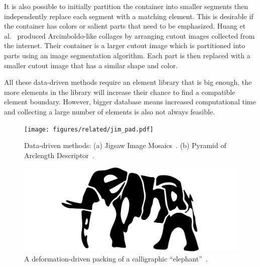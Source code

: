 \newtext
{
It is also possible to initially partition the container into smaller segments
then independently replace each segment with a matching element.
This is desirable if the container has colors or salient parts that need to be emphasized.
Huang et al.~\cite{Huang2011} produced Arcimboldo-like collages
by arranging cutout images collected from the internet.
Their container is a larger cutout image which is partitioned into parts
using an image segmentation algorithm.
Each part is then replaced with a smaller cutout image that has a similar shape and color.
}

\newtext
{
All these data-driven methods require an element library that is big enough,
the more elements in the library will increase their chance to find a compatible element boundary.
However, bigger database means increased computational time and
collecting a large number of elements is also not always feasible.
}

\begin{figure}
\centering
\texttt{[image: figures/related/jim\_pad.pdf]} 
\caption[Packings generated by JIM and PAD]
{\label{fig_related_jim_pad} 
\newtext
{
Data-driven methods:
(a) Jigsaw Image Mosaics~\cite{Kim2002}.
(b) Pyramid of Arclength Descriptor~\cite{Kwan2016}. 
}
}
\end{figure}




\begin{figure}
\centering
\includegraphics[width=1.0\textwidth]{figures/related/calligraphy.pdf} 
\caption[A calligraphy packing of an ``elephant'']
{\label{fig_calligraphy_packing} 
\newtext
{
A deformation-driven packing of a calligraphic ``elephant''~\cite{Xu2007}.
}
}
\end{figure}


